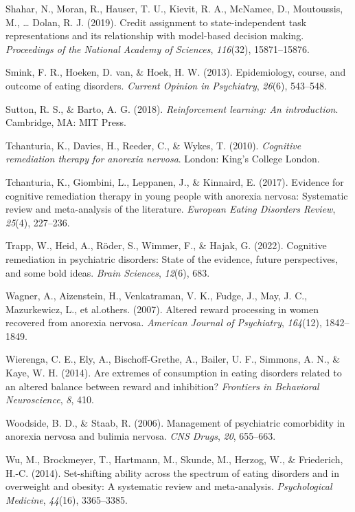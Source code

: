 \documentclass[
  man,floatsintext]{apa6}
\newlength{\cslhangindent}
\newlength{\cslentryspacingunit} %
\newenvironment{CSLReferences}[2] %
 {%
  \setlength{\parindent}{0pt}
  \ifodd #1
  \let\oldpar\par
  \def\par{\hangindent=\cslhangindent\oldpar}
  \fi
  \setlength{\parskip}{#2\cslentryspacingunit}
 }%
 {}
\begin{document}
\begin{CSLReferences}{1}{0}
\leavevmode{}%
Shahar, N., Moran, R., Hauser, T. U., Kievit, R. A., McNamee, D., Moutoussis, M., \ldots{} Dolan, R. J. (2019). Credit assignment to state-independent task representations and its relationship with model-based decision making. \emph{Proceedings of the National Academy of Sciences}, \emph{116}(32), 15871--15876.

\leavevmode{}%
Smink, F. R., Hoeken, D. van, \& Hoek, H. W. (2013). Epidemiology, course, and outcome of eating disorders. \emph{Current Opinion in Psychiatry}, \emph{26}(6), 543--548.

\leavevmode{}%
Sutton, R. S., \& Barto, A. G. (2018). \emph{Reinforcement learning: An introduction}. Cambridge, MA: MIT Press.

\leavevmode{}%
Tchanturia, K., Davies, H., Reeder, C., \& Wykes, T. (2010). \emph{Cognitive remediation therapy for anorexia nervosa}. London: King's College London.

\leavevmode{}%
Tchanturia, K., Giombini, L., Leppanen, J., \& Kinnaird, E. (2017). Evidence for cognitive remediation therapy in young people with anorexia nervosa: Systematic review and meta-analysis of the literature. \emph{European Eating Disorders Review}, \emph{25}(4), 227--236.

\leavevmode{}%
Trapp, W., Heid, A., Röder, S., Wimmer, F., \& Hajak, G. (2022). Cognitive remediation in psychiatric disorders: State of the evidence, future perspectives, and some bold ideas. \emph{Brain Sciences}, \emph{12}(6), 683.

\leavevmode{}%
Wagner, A., Aizenstein, H., Venkatraman, V. K., Fudge, J., May, J. C., Mazurkewicz, L., et al.others. (2007). Altered reward processing in women recovered from anorexia nervosa. \emph{American Journal of Psychiatry}, \emph{164}(12), 1842--1849.

\leavevmode{}%
Wierenga, C. E., Ely, A., Bischoff-Grethe, A., Bailer, U. F., Simmons, A. N., \& Kaye, W. H. (2014). Are extremes of consumption in eating disorders related to an altered balance between reward and inhibition? \emph{Frontiers in Behavioral Neuroscience}, \emph{8}, 410.

\leavevmode{}%
Woodside, B. D., \& Staab, R. (2006). Management of psychiatric comorbidity in anorexia nervosa and bulimia nervosa. \emph{CNS Drugs}, \emph{20}, 655--663.

\leavevmode{}%
Wu, M., Brockmeyer, T., Hartmann, M., Skunde, M., Herzog, W., \& Friederich, H.-C. (2014). Set-shifting ability across the spectrum of eating disorders and in overweight and obesity: A systematic review and meta-analysis. \emph{Psychological Medicine}, \emph{44}(16), 3365--3385.

\end{CSLReferences}
\end{document}
